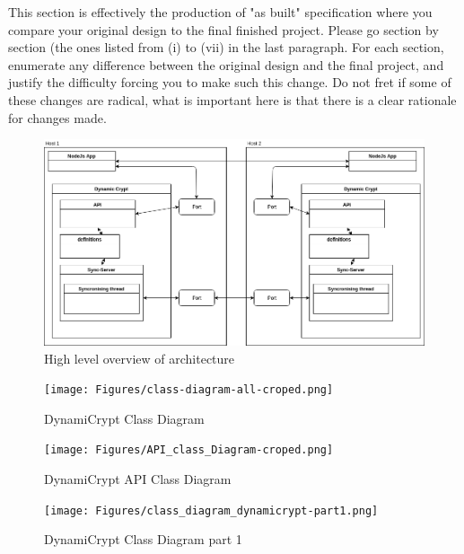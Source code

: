 This section is effectively the production of "as built" specification where you compare your original design to the final finished project. Please go section by section (the ones listed from (i) to (vii) in the last paragraph. For each section, enumerate any difference between the original design and the final project, and justify the difficulty forcing you to make such this change. Do not fret if some of these changes are radical, what is important here is that there is a clear rationale for changes made.

\begin{figure}[!h]
  \centering
      \includegraphics[width=1\textwidth]{Figures/basic-2hosts-final.png}
  \caption[High level overview of architecture]{High level overview of architecture}
  \label{fig:basic-two-hosts-final}
\end{figure}
\FloatBarrier

\begin{figure}[!h]
  \centering
      \texttt{[image: Figures/class-diagram-all-croped.png]}
  \caption[DynamiCrypt Class Diagram]{DynamiCrypt Class Diagram}
  \label{fig:class-diagram-all}
\end{figure}
\FloatBarrier

\begin{figure}[!h]
  \centering
      \texttt{[image: Figures/API\_class\_Diagram-croped.png]}
  \caption[DynamiCrypt API Class Diagram]{DynamiCrypt API Class Diagram}
  \label{fig:API_class_Diagram}
\end{figure}
\FloatBarrier

\begin{figure}[!h]
  \centering
      \texttt{[image: Figures/class\_diagram\_dynamicrypt-part1.png]}
  \caption[DynamiCrypt Class Diagram part 1]{DynamiCrypt Class Diagram part 1}
  \label{fig:class_diagram_dynamicrypt-part1}
\end{figure}
\FloatBarrier

